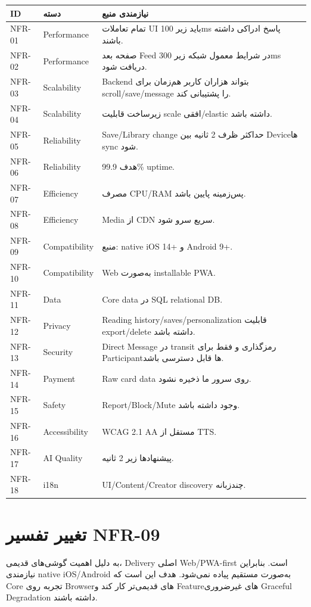 \begin{longtable}{p{1.7cm}p{3.1cm}p{8.6cm}}
\toprule
\textbf{ID} & \textbf{دسته} & \textbf{نیازمندی منبع} \\
\midrule
\endhead
NFR-01 & Performance & تمام تعاملات UI باید زیر 100ms پاسخ ادراکی داشته باشند. \\
NFR-02 & Performance & صفحه بعد Feed در شرایط معمول شبکه زیر 300ms دریافت شود. \\
NFR-03 & Scalability & Backend بتواند هزاران کاربر هم‌زمان برای scroll/save/message را پشتیبانی کند. \\
NFR-04 & Scalability & زیرساخت قابلیت scale افقی/elastic داشته باشد. \\
NFR-05 & Reliability & Save/Library change حداکثر ظرف 2 ثانیه بین Deviceها sync شود. \\
NFR-06 & Reliability & هدف 99.9\% uptime. \\
NFR-07 & Efficiency & مصرف CPU/RAM پس‌زمینه پایین باشد. \\
NFR-08 & Efficiency & Media از CDN سریع سرو شود. \\
NFR-09 & Compatibility & منبع: native iOS 14+ و Android 9+. \\
NFR-10 & Compatibility & Web به‌صورت installable PWA. \\
NFR-11 & Data & Core data در SQL relational DB. \\
NFR-12 & Privacy & Reading history/saves/personalization قابلیت export/delete داشته باشد. \\
NFR-13 & Security & Direct Message در transit رمزگذاری و فقط برای Participantها قابل دسترسی باشد. \\
NFR-14 & Payment & Raw card data روی سرور ما ذخیره نشود. \\
NFR-15 & Safety & Report/Block/Mute وجود داشته باشد. \\
NFR-16 & Accessibility & WCAG 2.1 AA مستقل از TTS. \\
NFR-17 & AI Quality & پیشنهادها زیر 2 ثانیه. \\
NFR-18 & i18n & UI/Content/Creator discovery چندزبانه. \\
\bottomrule
\end{longtable}

\section{تغییر تفسیر NFR-09}

\begin{decisionbox}
به دلیل اهمیت گوشی‌های قدیمی، Delivery اصلی Web/PWA-first است. بنابراین نیازمندی native iOS/Android به‌صورت مستقیم پیاده نمی‌شود. هدف این است که Core تجربه روی Browserهای قدیمی‌تر کار کند و Featureهای غیرضروری Graceful Degradation داشته باشند.
\end{decisionbox}

